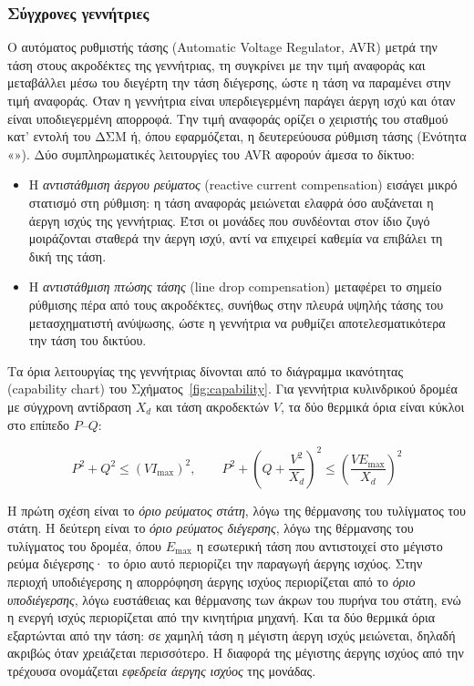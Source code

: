 \subsubsection{Σύγχρονες γεννήτριες}
\label{sec:sg}

Ο αυτόματος ρυθμιστής τάσης (Automatic Voltage Regulator, AVR) μετρά την τάση στους
ακροδέκτες της γεννήτριας, τη συγκρίνει με την τιμή αναφοράς και μεταβάλλει μέσω του διεγέρτη
την τάση διέγερσης, ώστε η τάση να παραμένει στην τιμή αναφοράς. Όταν η γεννήτρια είναι
υπερδιεγερμένη παράγει άεργη ισχύ και όταν είναι υποδιεγερμένη απορροφά. Την τιμή αναφοράς
ορίζει ο χειριστής του σταθμού κατ' εντολή του ΔΣΜ ή, όπου εφαρμόζεται, η δευτερεύουσα
ρύθμιση τάσης (Ενότητα «»). Δύο συμπληρωματικές λειτουργίες του AVR
αφορούν άμεσα το δίκτυο:

\begin{itemize}
\item Η \emph{αντιστάθμιση άεργου ρεύματος} (reactive current compensation) εισάγει μικρό
      στατισμό στη ρύθμιση: η τάση αναφοράς μειώνεται ελαφρά όσο αυξάνεται η άεργη ισχύς της
      γεννήτριας. Έτσι οι μονάδες που συνδέονται στον ίδιο ζυγό μοιράζονται σταθερά την άεργη
      ισχύ, αντί να επιχειρεί καθεμία να επιβάλει τη δική της τάση.
\item Η \emph{αντιστάθμιση πτώσης τάσης} (line drop compensation) μεταφέρει το σημείο
      ρύθμισης πέρα από τους ακροδέκτες, συνήθως στην πλευρά υψηλής τάσης του μετασχηματιστή
      ανύψωσης, ώστε η γεννήτρια να ρυθμίζει αποτελεσματικότερα την τάση του δικτύου.
\end{itemize}

Τα όρια λειτουργίας της γεννήτριας δίνονται από το διάγραμμα ικανότητας (capability chart)
του Σχήματος~\ref{fig:capability}. Για γεννήτρια κυλινδρικού δρομέα με σύγχρονη αντίδραση
$X_d$ και τάση ακροδεκτών $V$, τα δύο θερμικά όρια είναι κύκλοι στο επίπεδο $P$--$Q$:

\begin{equation}
P^2 + Q^2 \le \left(V I_{\max}\right)^2, \qquad
P^2 + \left(Q + \frac{V^2}{X_d}\right)^2 \le \left(\frac{V E_{\max}}{X_d}\right)^2
\label{eq:capability}
\end{equation}

Η πρώτη σχέση είναι το \emph{όριο ρεύματος στάτη}, λόγω της θέρμανσης του τυλίγματος του
στάτη. Η δεύτερη είναι το \emph{όριο ρεύματος διέγερσης}, λόγω της θέρμανσης του τυλίγματος
του δρομέα, όπου $E_{\max}$ η εσωτερική τάση που αντιστοιχεί στο μέγιστο ρεύμα διέγερσης· το
όριο αυτό περιορίζει την παραγωγή άεργης ισχύος. Στην περιοχή υποδιέγερσης η απορρόφηση άεργης
ισχύος περιορίζεται από το \emph{όριο υποδιέγερσης}, λόγω ευστάθειας και θέρμανσης των άκρων
του πυρήνα του στάτη, ενώ η ενεργή ισχύς περιορίζεται από την κινητήρια μηχανή. Και τα δύο
θερμικά όρια εξαρτώνται από την τάση: σε χαμηλή τάση η μέγιστη άεργη ισχύς μειώνεται, δηλαδή
ακριβώς όταν χρειάζεται περισσότερο. Η διαφορά της μέγιστης άεργης ισχύος από την τρέχουσα
ονομάζεται \emph{εφεδρεία άεργης ισχύος} της μονάδας.

